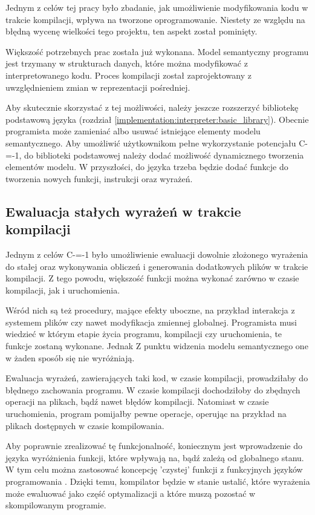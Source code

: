 Jednym z celów tej pracy było zbadanie, jak umożliwienie modyfikowania kodu w trakcie kompilacji, wpływa na tworzone oprogramowanie.
Niestety ze względu na błędną wycenę wielkości tego projektu, ten aspekt został pominięty.

Większość potrzebnych prac została już wykonana.
Model semantyczny programu jest trzymany w strukturach danych, które można modyfikować z interpretowanego kodu.
Proces kompilacji został zaprojektowany z uwzględnieniem zmian w reprezentacji pośredniej.

Aby skutecznie skorzystać z tej możliwości, należy jeszcze rozszerzyć bibliotekę podstawową języka (rozdział \ref{implementation:interpreter:basic_library}).
Obecnie programista może zamieniać albo usuwać istniejące elementy modelu semantycznego.
Aby umożliwić użytkownikom pełne wykorzystanie potencjału C-=-1, do biblioteki podstawowej należy dodać możliwość dynamicznego tworzenia elementów modelu.
W przyszłości, do języka trzeba będzie dodać funkcje do tworzenia nowych funkcji, instrukcji oraz wyrażeń.

\subsection{Ewaluacja stałych wyrażeń w trakcie kompilacji}
\label{compile_time_constant_evaluation}
Jednym z celów C-=-1 było umożliwienie ewaluacji dowolnie złożonego wyrażenia do stałej oraz wykonywania obliczeń i generowania dodatkowych plików w trakcie kompilacji.
Z tego powodu, większość funkcji można wykonać zarówno w czasie kompilacji, jak i uruchomienia.

Wśród nich są też procedury, mające efekty uboczne, na przykład interakcja z systemem plików czy nawet modyfikacja zmiennej globalnej.
Programista musi wiedzieć w którym etapie życia programu, kompilacji czy uruchomienia, te funkcje zostaną wykonane.
Jednak Z punktu widzenia modelu semantycznego one w żaden sposób się nie wyróżniają.

Ewaluacja wyrażeń, zawierających taki kod, w czasie kompilacji, prowadziłaby do błędnego zachowania programu.
W czasie kompilacji dochodziłoby do zbędnych operacji na plikach, bądź nawet błędów kompilacji.
Natomiast w czasie uruchomienia, program pomijałby pewne operacje, operując na przykład na plikach dostępnych w czasie kompilowania.

Aby poprawnie zrealizować tę funkcjonalność, koniecznym jest wprowadzenie do języka wyróżnienia funkcji, które wpływają na, bądź zależą od globalnego stanu.
W tym celu można zastosować koncepcję 'czystej' funkcji z funkcyjnych języków programowania \cite{McLoughlin1989ImperativeEF}.
Dzięki temu, kompilator będzie w stanie ustalić, które wyrażenia może ewaluować jako część optymalizacji a które muszą pozostać w skompilowanym programie.

